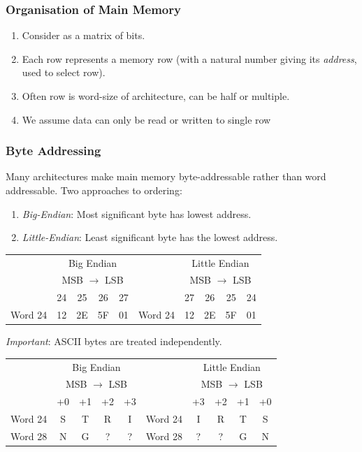 \documentclass[twocolumn,english]{article}
\providecommand{\tabularnewline}{\\}
\begin{document}
\subsubsection{Organisation of Main Memory}
\begin{enumerate}
\item Consider as a matrix of bits. 
\item Each row represents a memory row (with a natural number giving its
\emph{address}, used to select row). 
\item Often row is word-size of architecture, can be half or multiple. 
\item We assume data can only be read or written to single row
\end{enumerate}

\subsubsection{Byte Addressing}

Many architectures make main memory byte-addressable rather than word
addressable. Two approaches to ordering:
\begin{enumerate}
\item \emph{Big-Endian}: Most significant byte has lowest address.
\item \emph{Little-Endian}: Least significant byte has the lowest address.
\end{enumerate}
\noindent 
\begin{table}[H]
\noindent \centering{}%
\begin{tabular}{cccccccccc}
 & \multicolumn{4}{c}{Big Endian} &  & \multicolumn{4}{c}{Little Endian}\tabularnewline
 & \multicolumn{4}{c}{MSB $\rightarrow$ LSB} &  & \multicolumn{4}{c}{MSB $\rightarrow$ LSB}\tabularnewline
 & 24 & 25 & 26 & 27 &  & 27 & 26 & 25 & 24\tabularnewline
\cline{2-5} \cline{7-10} 
\multicolumn{1}{c|}{Word 24} & 12 & 2E & 5F & \multicolumn{1}{c|}{01} & \multicolumn{1}{c|}{Word 24} & 12 & 2E & 5F & \multicolumn{1}{c|}{01}\tabularnewline
\cline{2-5} \cline{7-10} 
\end{tabular}
\end{table}


\emph{Important}: ASCII bytes are treated independently.

\noindent 
\begin{table}[H]
\noindent \centering{}%
\begin{tabular}{cccccccccc}
 & \multicolumn{4}{c}{Big Endian} &  & \multicolumn{4}{c}{Little Endian}\tabularnewline
 & \multicolumn{4}{c}{MSB $\rightarrow$ LSB} &  & \multicolumn{4}{c}{MSB $\rightarrow$ LSB}\tabularnewline
 & +0 & +1 & +2 & +3 &  & +3 & +2 & +1 & +0\tabularnewline
\cline{2-5} \cline{7-10} 
\multicolumn{1}{c|}{Word 24} & S & T & R & \multicolumn{1}{c|}{I} & \multicolumn{1}{c|}{Word 24} & I & R & T & \multicolumn{1}{c|}{S}\tabularnewline
\multicolumn{1}{c|}{Word 28} & N & G & ? & \multicolumn{1}{c|}{?} & \multicolumn{1}{c|}{Word 28} & ? & ? & G & \multicolumn{1}{c|}{N}\tabularnewline
\cline{2-5} \cline{7-10} 
\end{tabular}
\end{table}
\end{document}
